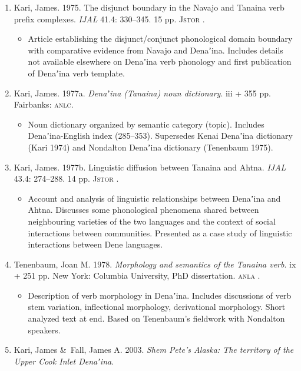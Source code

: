 \documentclass[12pt,letterpaper,oneside,article]{memoir}
\begin{document}
\begin{enumerate}
\item	Kari, James.
	1975.
	The disjunct boundary in the Navajo and Tanaina verb prefix complexes.
	\textit{IJAL} 41.4: 330–345.
	15 pp.
	\textsc{Jstor} .
	\begin{itemize}
	\item	Article establishing the disjunct/conjunct phonological domain boundary
		with comparative evidence from Navajo and Denaʼina.
		Includes details not available elsewhere on Denaʼina verb phonology
		and first publication of Denaʼina verb template.
	\end{itemize}
\item	Kari, James.
	1977a.
	\textit{Denaʼina (Tanaina) noun dictionary}.
	iii + 355 pp.
	Fairbanks: \textsc{anlc}.
	\begin{itemize}
	\item	Noun dictionary organized by semantic category (topic).
		Includes Denaʼina-English index (285–353).
		Supersedes Kenai Denaʼina dictionary (Kari 1974) and Nondalton Denaʼina
		dictionary (Tenenbaum 1975).
	\end{itemize}
\item	Kari, James.
	1977b.
	Linguistic diffusion between Tanaina and Ahtna.
	\textit{IJAL} 43.4: 274–288.
	14 pp.
	\textsc{Jstor} .
	\begin{itemize}
	\item	Account and analysis of linguistic relationships between Denaʼina and Ahtna.
		Discusses some phonological phenomena shared between neighbouring varieties
		of the two languages and the context of social interactions between
		communities.
		Presented as a case study of linguistic interactions between Dene languages.
	\end{itemize}
\item	Tenenbaum, Joan M.
	1978.
	\textit{Morphology and semantics of the Tanaina verb}.
	ix + 251 pp.
	New York: Columbia University, PhD dissertation.
	\textsc{anla} .
	\begin{itemize}
	\item	Description of verb morphology in Denaʼina.
		Includes discussions of verb stem variation, inflectional morphology,
		derivational morphology.
		Short analyzed text at end.
		Based on Tenenbaum’s fieldwork with Nondalton speakers.
	\end{itemize}
\item	Kari, James \&\ Fall, James A.
	2003.
	\textit{Shem Pete’s Alaska: The territory of the Upper Cook Inlet Denaʼina}.

\end{enumerate}
\end{document}
